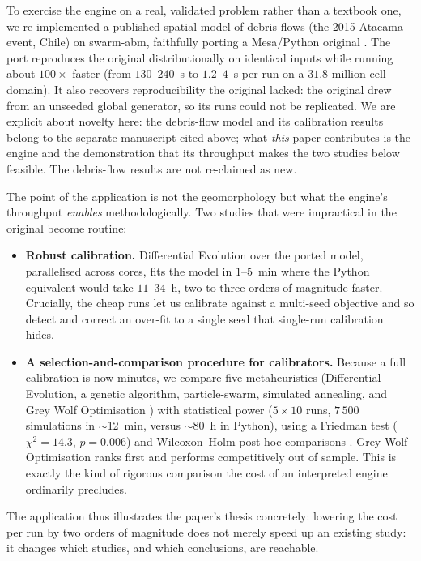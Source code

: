 \documentclass[review]{elsarticle}
\begin{document}
To exercise the engine on a real, validated problem rather than a textbook one,
we re-implemented a published spatial model of debris flows (the 2015 Atacama
event, Chile) on swarm-abm, faithfully porting a Mesa/Python original
\cite{debrisflow2026}. The port reproduces the original distributionally on
identical inputs while running about $100\times$ faster (from $130$--$240$~s to
$1.2$--$4$~s per run on a $31.8$-million-cell domain). It also recovers
reproducibility the original lacked: the original drew from an unseeded
global generator, so its runs could not be replicated. We are explicit about
novelty here: the debris-flow model and its calibration results belong to the
separate manuscript cited above; what \emph{this} paper contributes is the
engine and the demonstration that its throughput makes the two studies below
feasible. The debris-flow results are not re-claimed as new.

The point of the application is not the geomorphology but what the engine's
throughput \emph{enables} methodologically. Two studies that were impractical in
the original become routine:
\begin{itemize}
  \item \textbf{Robust calibration.} Differential Evolution
  \cite{storn1997differential} over the ported model, parallelised across cores,
  fits the model in $1$--$5$~min where the Python equivalent would take
  $11$--$34$~h, two to three orders of magnitude faster. Crucially, the cheap
  runs let us calibrate
  against a multi-seed objective and so detect and correct an over-fit to a
  single seed that single-run calibration hides.
  \item \textbf{A selection-and-comparison procedure for calibrators.} Because a
  full calibration is now minutes, we compare five metaheuristics
  (Differential Evolution, a genetic algorithm, particle-swarm, simulated
  annealing, and Grey Wolf Optimisation \cite{mirjalili2014grey}) with
  statistical power ($5\times10$ runs, $7\,500$ simulations in $\sim$12~min,
  versus $\sim$80~h in Python), using a Friedman test
  ($\chi^2 = 14.3$, $p = 0.006$) and Wilcoxon--Holm post-hoc comparisons
  \cite{demsar2006statistical}. Grey Wolf Optimisation ranks first and performs
  competitively out of sample. This is exactly the kind of rigorous comparison
  the cost of an interpreted engine ordinarily precludes.
\end{itemize}
The application thus illustrates the paper's thesis concretely: lowering the
cost per run by two orders of magnitude does not merely speed up an existing
study: it changes which studies, and which conclusions, are reachable.
\end{document}
